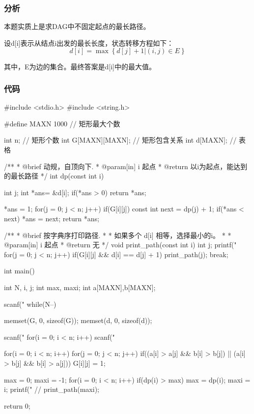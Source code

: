 \subsubsection{分析}
本题实质上是求DAG中不固定起点的最长路径。

设d[i]表示从结点i出发的最长长度，状态转移方程如下：
$$d[i]=\max\left\{d[j]+1|(i,j) \in E\right\}$$

其中，E为边的集合。最终答案是d[i]中的最大值。

\subsubsection{代码}
\begin{Codex}[label=embedded_rectangles.c]
#include <stdio.h>
#include <string.h>

#define MAXN 1000 // 矩形最大个数

int n; // 矩形个数
int G[MAXN][MAXN]; // 矩形包含关系
int d[MAXN]; // 表格

/**
 * @brief 动规，自顶向下.
 * @param[in] i 起点
 * @return 以i为起点，能达到的最长路径
 */
int dp(const int i) {
    int j;
    int *ans= &d[i];
    if(*ans > 0) return *ans;

    *ans = 1;
    for(j = 0; j < n; j++) if(G[i][j]) {
        const int next = dp(j) + 1;
        if(*ans < next) *ans = next;
    }
    return *ans;
}

/**
 * @brief 按字典序打印路径.
 *
 * 如果多个 d[i] 相等，选择最小的i。
 *
 * @param[in] i 起点
 * @return 无
 */
void print_path(const int i) {
    int j;
    printf("%
    for(j = 0; j < n; j++) if(G[i][j] && d[i] == d[j] + 1) {
        print_path(j);
        break;
    }
}

int main() {
    int N, i, j;
    int max, maxi;
    int a[MAXN],b[MAXN];

    scanf("%
    while(N--) {
        memset(G, 0, sizeof(G));
        memset(d, 0, sizeof(d));

        scanf("%
        for(i = 0; i < n; i++) scanf("%

        for(i = 0; i < n; i++)
            for(j = 0; j < n; j++)
                if((a[i] > a[j] && b[i] > b[j]) ||
                    (a[i] > b[j] && b[i] > a[j])) G[i][j] = 1;

        max = 0;
        maxi = -1;
        for(i = 0; i < n; i++) if(dp(i) > max) {
            max = dp(i);
            maxi = i;
        }
        printf("%
        // print_path(maxi);
    }
    return 0;
}
\end{Codex}

